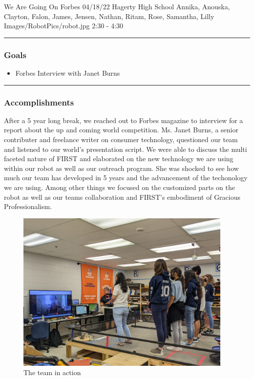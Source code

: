 \insertmeeting 
	{We Are Going On Forbes} 
	{04/18/22} 
	{Hagerty High School}
	{Annika, Anouska, Clayton, Falon, James, Jensen, Nathan, Ritam, Rose, Samantha, Lilly}
	{Images/RobotPics/robot.jpg}
	{2:30 - 4:30}
	
\noindent\hfil\rule{\textwidth}{.4pt}\hfil
\subsubsection*{Goals}
\begin{itemize}
    \item Forbes Interview with Janet Burns


\end{itemize} 

\noindent\hfil\rule{\textwidth}{.4pt}\hfil

\subsubsection*{Accomplishments}
After a 5 year long break, we reached out to Forbes magazine to interview for a report about the up and coming world competition. Ms. Janet Burns, a senior contributer and freelance writer on consumer technology, questioned our team and listened to our world's presentation script. We were able to discuss the multi faceted nature of FIRST and elaborated on the new technology we are using within our robot as well as our outreach program. She was shocked to see how much our team has developed in 5 years and the advancement of the techonology we are using. Among other things we focused on the customized parts on the robot as well as our teams collaboration and FIRST's embodiment of Gracious Professionalism. 

\begin{figure}[htp]
\centering
\includegraphics[width=0.95\textwidth, angle=0]{Meetings/April/04-18-22/04-18-22 1.JPG}
\caption{The team in action}
\label{fig:041822_1}
\end{figure}

